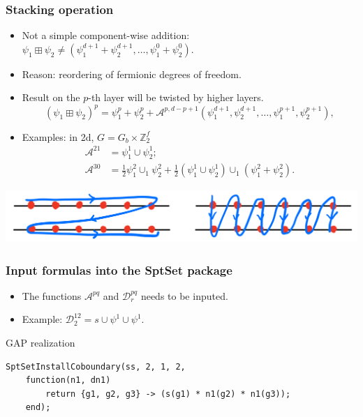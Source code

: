\documentclass[xcolor=table, aspectratio=169]{beamer}
\begin{document}
\begin{frame}
	\frametitle{Stacking operation}
	\begin{itemize}
		\item Not a simple component-wise addition:
		$\psi_1\boxplus\psi_2\neq (\psi_1^{d+1}+\psi_2^{d+1},\ldots,\psi_1^0+\psi_2^0)$.
		\item Reason: reordering of fermionic degrees of freedom.
		\item Result on the $p$-th layer will be twisted by higher layers.
		\[(\psi_1\boxplus\psi_2)^p = \psi_1^p + \psi_2^p
    + \mathcal A^{p,d-p+1}(\psi_1^{d+1},\psi_2^{d+1},\ldots,\psi_1^{p+1}, \psi_2^{p+1}),\]
		\item Examples: in 2d, $G=G_b\times\mathbb Z_2^f$
		\begin{align*}
		  \mathcal A^{21} &= \psi^1_1\cup\psi^1_2;\\
		  \mathcal A^{30} &= \frac12\psi^2_1\cup_1\psi^2_2 + \frac12 (\psi^1_1\cup\psi^1_2)\cup_1(\psi^2_1+\psi^2_2).
		\end{align*}
	\end{itemize}
	\begin{center}
		\includegraphics[height=2cm]{forder}
	\end{center}
\end{frame}

\begin{frame}[fragile]
	\frametitle{Input formulas into the SptSet package}
	\begin{itemize}
		\item The functions $\mathcal A^{pq}$ and $\mathcal D^{pq}_r$ needs to be inputed.
		\item Example: $\mathcal D_2^{12} = s\cup\psi^1\cup\psi^1$.
	\end{itemize}

	\begin{block}{GAP realization}
	\begin{lstlisting}[basicstyle=\footnotesize]
	SptSetInstallCoboundary(ss, 2, 1, 2,
	function(n1, dn1)
		return {g1, g2, g3} -> (s(g1) * n1(g2) * n1(g3));
	end);
	\end{lstlisting}
	\end{block}

\end{frame}
\end{document}
